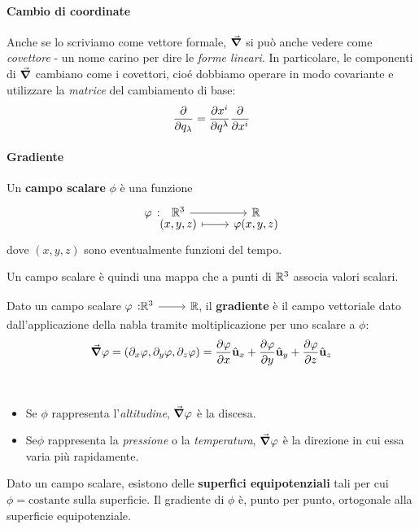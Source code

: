 \paragraph{Cambio di coordinate} %
Anche se lo scriviamo come vettore formale, $\grad$ si può anche vedere come \textit{covettore} - un nome carino per dire le \textit{forme lineari}. In particolare, le componenti di $\grad$ cambiano come i covettori, cioé dobbiamo operare in modo covariante e utilizzare la \textit{matrice} del cambiamento di base:
\begin{equation}
	\pdv{q_\lambda}=\pdv{x^i}{q^\lambda}\pdv{x^i}
\end{equation}
\paragraph{Gradiente}
\begin{define}
	Un \textbf{campo scalare} $\phi$ è una funzione
	\begin{equation}
		\funztot[\phi]{\realset^3}{\realset}{(x,y,z)}{\phi(x,y,z)}
	\end{equation}
	dove $(x,y,z)$ sono eventualmente funzioni del tempo.
\end{define}
Un campo scalare è quindi una mappa che a punti di $\mathbb{R}^3$ associa valori scalari.
\begin{define}[Gradiente]\label{gradiente}
	Dato un campo scalare $\funz[\phi]{\realset^3}{\realset}$, il \textbf{gradiente} è il campo vettoriale dato dall'applicazione della nabla tramite moltiplicazione per uno scalare a $\phi$:
	\begin{equation}
		\grad{\varphi}=\left(\partial_x\varphi,\partial_y\varphi,\partial_z\varphi\right)=\pdv{\varphi}{x}\hat{\mathbf{u}}_x+\pdv{\varphi}{y}\hat{\mathbf{u}}_y+\pdv{\varphi}{z}\hat{\mathbf{u}}_z
	\end{equation}
\end{define}
\begin{examples}~
	\begin{itemize}
		\item Se $\phi$ rappresenta l'\textit{altitudine}, $\grad{\varphi}$ è la discesa.
		\item Se$\phi$ rappresenta la \textit{pressione} o la \textit{temperatura}, $\grad{\varphi}$ è la direzione in cui essa varia più rapidamente.
	\end{itemize}
\end{examples}
\begin{observe}
	Dato un campo scalare, esistono delle \textbf{superfici equipotenziali} tali per cui $\phi=\text{costante}$ sulla superficie. Il gradiente di $\phi$ è, punto per punto, ortogonale alla superficie equipotenziale.
\end{observe}
